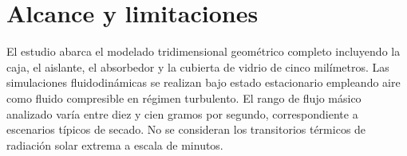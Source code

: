 \section{Alcance y limitaciones}
\label{sec:cap01_alcance}

El estudio abarca el modelado tridimensional geométrico completo incluyendo la caja, el aislante, el absorbedor y la cubierta de vidrio de cinco milímetros.
Las simulaciones fluidodinámicas se realizan bajo estado estacionario empleando aire como fluido compresible en régimen turbulento.
El rango de flujo másico analizado varía entre diez y cien gramos por segundo, correspondiente a escenarios típicos de secado.
No se consideran los transitorios térmicos de radiación solar extrema a escala de minutos.
